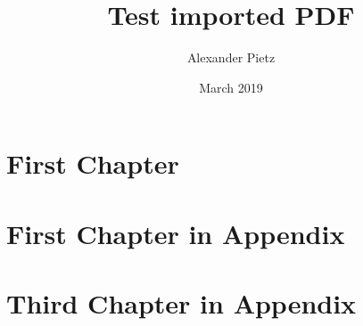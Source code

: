 \documentclass{report}
\title{Test imported PDF}
\author{Alexander Pietz}
\date{March 2019}
\begin{document}
\tableofcontents

\chapter{First Chapter}
\blindtext[5]


\appendix
\chapter{First Chapter in Appendix}
\blindtext[1]

\newpage
\addtocounter{chapter}{1}


\chapter{Third Chapter in Appendix}
\blindtext[1]
\end{document}
